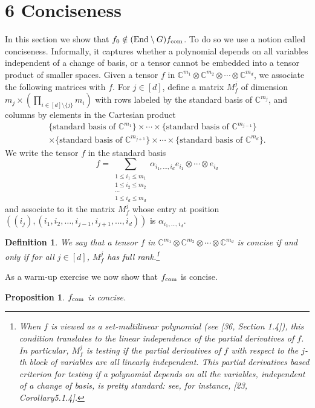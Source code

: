 \documentclass[10pt,a4paper]{article}
\newtheorem{definition}[theorem]{Definition}
\newtheorem{proposition}[theorem]{Proposition}
\newcommand{\C}{\mathbb C}
\newcommand{\fcom}{f_{\rm com}}
\newcommand{\End}{\mathrm{End}}
\begin{document}
\section*{6 Conciseness}
In this section we show that $f_0\notin(\End\setminus G)\fcom$. To do so we use a notion called conciseness. Informally, it captures whether a polynomial depends on all variables independent of a change of basis, or a tensor cannot be embedded into a tensor product of smaller spaces.
Given a tensor $f$ in $\C^{m_1}\otimes\C^{m_2}\otimes\cdots\otimes\C^{m_d}$, we associate the following matrices with $f$. For $j\in[d]$, define a matrix $M_f^j$ of dimension $m_j\times(\prod_{i\in[d]\setminus\{j\}}m_i)$ with rows labeled by the standard basis of $\C^{m_j}$, and columns by elements in the Cartesian product
\begin{multline*}
\{\text{standard basis of }\C^{m_1}\}\times\cdots\times\{\text{standard basis of }\C^{m_{j-1}}\}\\
\times\{\text{standard basis of }\C^{m_{j+1}}\}\times\cdots\times\{\text{standard basis of }\C^{m_d}\}.
\end{multline*}
We write the tensor $f$ in the standard basis
\[f=\sum_{\substack{1\le i_1\le m_1\\1\le i_2\le m_2\\\cdots\\1\le i_d\le m_d}}\alpha_{i_1,\ldots,i_d}e_{i_1}\otimes\cdots\otimes e_{i_d}\]
and associate to it the matrix $M_f^j$ whose entry at position $((i_j),(i_1,i_2,\ldots,i_{j-1},i_{j+1},\ldots,i_d))$ is $\alpha_{i_1,\ldots,i_d}$.
\begin{definition}
We say that a tensor $f$ in $\C^{m_1}\otimes\C^{m_2}\otimes\cdots\otimes\C^{m_d}$ is concise if and only if for all $j\in[d]$, $M_f^j$ has full rank.\footnote{When $f$ is viewed as a set-multilinear polynomial (see [36, Section 1.4]), this condition translates to the linear independence of the partial derivatives of $f$. In particular, $M_f^j$ is testing if the partial derivatives of $f$ with respect to the $j$-th block of variables are all linearly independent. This partial derivatives based criterion for testing if a polynomial depends on all the variables, independent of a change of basis, is pretty standard: see, for instance, [23, Corollary5.1.4].}
\end{definition}
As a warm-up exercise we now show that $\fcom$ is concise.
\begin{proposition}$\fcom$ is concise.\end{proposition}
\end{document}
